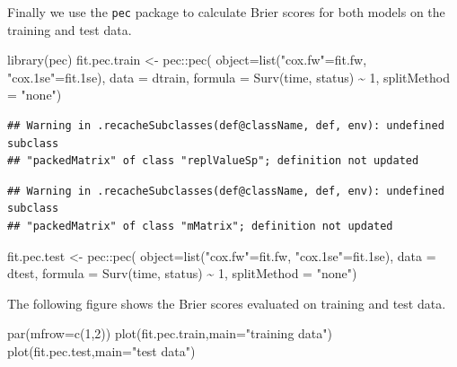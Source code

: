 \documentclass[
]{book}
\newenvironment{Shaded}{\begin{snugshade}}{\end{snugshade}}
\newcommand{\AttributeTok}[1]{\textcolor[rgb]{0.77,0.63,0.00}{#1}}
\newcommand{\DecValTok}[1]{\textcolor[rgb]{0.00,0.00,0.81}{#1}}
\newcommand{\FloatTok}[1]{\textcolor[rgb]{0.00,0.00,0.81}{#1}}
\newcommand{\FunctionTok}[1]{\textcolor[rgb]{0.00,0.00,0.00}{#1}}
\newcommand{\NormalTok}[1]{#1}
\newcommand{\OtherTok}[1]{\textcolor[rgb]{0.56,0.35,0.01}{#1}}
\newcommand{\SpecialCharTok}[1]{\textcolor[rgb]{0.00,0.00,0.00}{#1}}
\newcommand{\StringTok}[1]{\textcolor[rgb]{0.31,0.60,0.02}{#1}}
\begin{document}
Finally we use the \texttt{pec} package to calculate Brier scores for both models on the training and test data.

\begin{Shaded}
\begin{Highlighting}[]
\FunctionTok{library}\NormalTok{(pec)}
\NormalTok{fit.pec.train }\OtherTok{\textless{}{-}}\NormalTok{ pec}\SpecialCharTok{::}\FunctionTok{pec}\NormalTok{(}
  \AttributeTok{object=}\FunctionTok{list}\NormalTok{(}\StringTok{"cox.fw"}\OtherTok{=}\NormalTok{fit.fw,}
              \StringTok{"cox.1se"}\OtherTok{=}\NormalTok{fit}\FloatTok{.1}\NormalTok{se), }
  \AttributeTok{data =}\NormalTok{ dtrain, }
  \AttributeTok{formula =} \FunctionTok{Surv}\NormalTok{(time, status) }\SpecialCharTok{\textasciitilde{}} \DecValTok{1}\NormalTok{, }
  \AttributeTok{splitMethod =} \StringTok{"none"}\NormalTok{)}
\end{Highlighting}
\end{Shaded}

\begin{verbatim}
## Warning in .recacheSubclasses(def@className, def, env): undefined subclass
## "packedMatrix" of class "replValueSp"; definition not updated
\end{verbatim}

\begin{verbatim}
## Warning in .recacheSubclasses(def@className, def, env): undefined subclass
## "packedMatrix" of class "mMatrix"; definition not updated
\end{verbatim}

\begin{Shaded}
\begin{Highlighting}[]
\NormalTok{fit.pec.test }\OtherTok{\textless{}{-}}\NormalTok{ pec}\SpecialCharTok{::}\FunctionTok{pec}\NormalTok{(}
  \AttributeTok{object=}\FunctionTok{list}\NormalTok{(}\StringTok{"cox.fw"}\OtherTok{=}\NormalTok{fit.fw,}
              \StringTok{"cox.1se"}\OtherTok{=}\NormalTok{fit}\FloatTok{.1}\NormalTok{se), }
  \AttributeTok{data =}\NormalTok{ dtest, }
  \AttributeTok{formula =} \FunctionTok{Surv}\NormalTok{(time, status) }\SpecialCharTok{\textasciitilde{}} \DecValTok{1}\NormalTok{, }
  \AttributeTok{splitMethod =} \StringTok{"none"}\NormalTok{)}
\end{Highlighting}
\end{Shaded}

The following figure shows the Brier scores evaluated on training and test data.

\begin{Shaded}
\begin{Highlighting}[]
\FunctionTok{par}\NormalTok{(}\AttributeTok{mfrow=}\FunctionTok{c}\NormalTok{(}\DecValTok{1}\NormalTok{,}\DecValTok{2}\NormalTok{))}
\FunctionTok{plot}\NormalTok{(fit.pec.train,}\AttributeTok{main=}\StringTok{"training data"}\NormalTok{)}
\FunctionTok{plot}\NormalTok{(fit.pec.test,}\AttributeTok{main=}\StringTok{"test data"}\NormalTok{)}
\end{Highlighting}
\end{Shaded}
\end{document}
